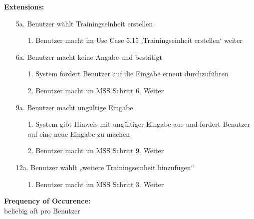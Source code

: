 \documentclass[12pt,a4paper,onecolumn]{article}
\begin{document}
\textbf{Extensions:}
\begin{enumerate}
    \item [5a.]  Benutzer wählt \gls{Trainingseinheit} erstellen
    \begin{enumerate}
        \item[1.]Benutzer macht im Use Case 5.15 ‚\gls{Trainingseinheit} erstellen‘ weiter
    \end{enumerate}
    \item [6a.]Benutzer macht keine Angabe und bestätigt
    \begin{enumerate}
        \item[1.]System fordert Benutzer auf die Eingabe erneut durchzuführen
        \item[2.]Benutzer macht im MSS Schritt 6. Weiter
    \end{enumerate}
    \item[9a.] Benutzer macht ungültige Eingabe
    \begin{enumerate}
        \item [1.]System gibt Hinweis mit ungültiger Eingabe aus und fordert Benutzer auf eine neue Eingabe zu machen
        \item [2.]Benutzer macht im MSS Schritt 9. Weiter
    \end{enumerate}
    \item[12a.]Benutzer wählt „weitere \gls{Trainingseinheit} hinzufügen“
    \begin{enumerate}
        \item [1.]Benutzer macht im MSS Schritt 3. Weiter
    \end{enumerate}
\end{enumerate}
\textbf{Frequency of Occurence:}\\beliebig oft pro Benutzer  \\
\end{document}
